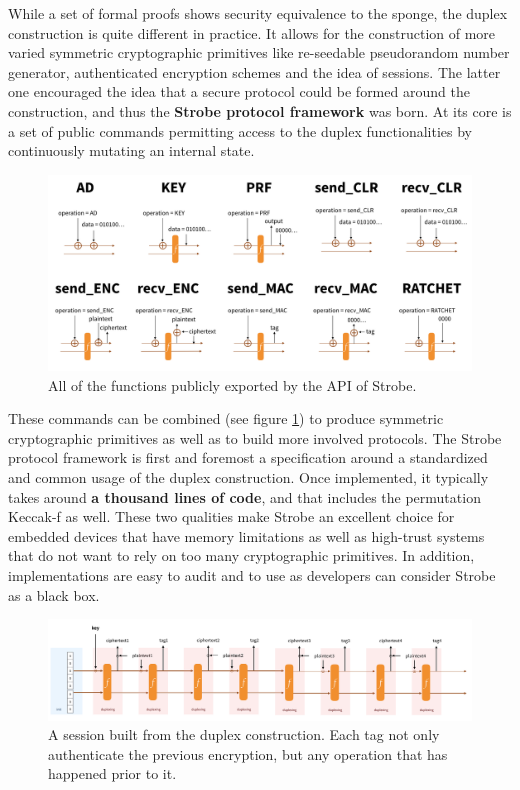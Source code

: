 \documentclass{article}
\begin{document}
While a set of formal proofs shows security equivalence to the sponge, the duplex construction is quite different in practice. It allows for the construction of more varied symmetric cryptographic primitives like re-seedable pseudorandom number generator, authenticated encryption schemes and the idea of sessions. The latter one encouraged the idea that a secure protocol could be formed around the construction, and thus the \textbf{Strobe protocol framework} was born. At its core is a set of public commands permitting access to the duplex functionalities by continuously mutating an internal state.

\begin{figure}[H]
\centering
\includegraphics[width=\textwidth]{rwcimg/strobe.png}
\caption{All of the functions publicly exported by the API of Strobe.}
\label{fig:strobe}
\end{figure}

These commands can be combined (see figure \ref{fig:strobe}) to produce symmetric cryptographic primitives as well as to build more involved protocols. The Strobe protocol framework is first and foremost a specification around a standardized and common usage of the duplex construction. Once implemented, it typically takes around \textbf{a thousand lines of code}, and that includes the permutation Keccak-f as well. These two qualities make Strobe an excellent choice for embedded devices that have memory limitations as well as high-trust systems that do not want to rely on too many cryptographic primitives. In addition, implementations are easy to audit and to use as developers can consider Strobe as a black box.

\begin{figure}[H]
\centering
\includegraphics[width=\textwidth]{rwcimg/session.png}
\caption{A session built from the duplex construction. Each tag not only authenticate the previous encryption, but any operation that has happened prior to it.}
\end{figure}
\end{document}
